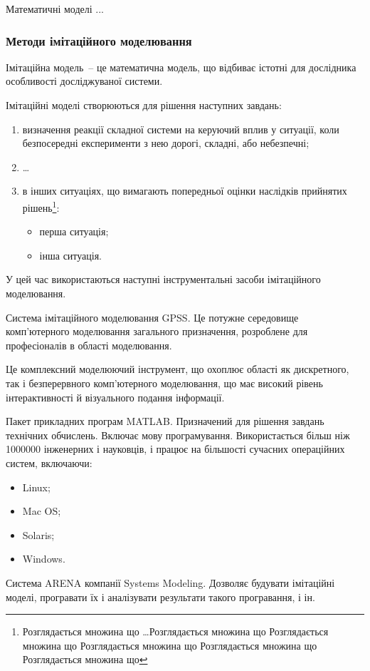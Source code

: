 Математичні моделі ...

\subsubsection{Методи імітаційного моделювання}
Імітаційна модель~-- це математична модель, що відбиває істотні для дослідника особливості досліджуваної системи.

Імітаційні моделі створюються для рішення наступних завдань:
\begin{enumerate}
\item визначення реакції складної системи на керуючий вплив у ситуації, коли безпосередні експерименти з нею дорогі, складні, або небезпечні;
\item \dots
\item в інших ситуаціях, що вимагають попередньої оцінки наслідків прийнятих
рішень\footnote{Розглядається множина що \ldots Розглядається множина що
Розглядається множина що Розглядається множина що Розглядається множина що
Розглядається множина що}:
\begin{itemize}
\item перша ситуація;
\item інша ситуація.
\end{itemize}
\end{enumerate}
У цей час використаються наступні інструментальні засоби імітаційного моделювання.
\begin{longEnumerate}
\item Система імітаційного моделювання GPSS. Це потужне середовище комп'ютерного моделювання загального призначення, розроблене для професіоналів в області моделювання. 
\item Це комплексний моделюючий інструмент, що охоплює області як дискретного, так і безперервного комп'ютерного моделювання, що має високий рівень інтерактивності й візуального подання інформації.
\item Пакет прикладних програм MATLAB. Призначений для рішення завдань технічних обчислень. Включає мову програмування. Використається більш ніж 1000000 інженерних і науковців, і працює на більшості сучасних операційних систем, включаючи:
\begin{itemize}
\item Linux; 
\item Mac OS; 
\item Solaris; 
\item Windows.
\end{itemize}
\item Система ARENA компанії Systems Modeling. Дозволяє будувати імітаційні моделі, програвати їх і аналізувати результати такого програвання, і ін.
\end{longEnumerate}

